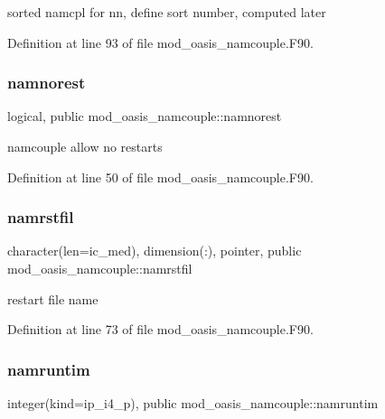 sorted namcpl for nn, define sort number, computed later 



Definition at line 93 of file mod\+\_\+oasis\+\_\+namcouple.\+F90.

\mbox{\label{namespacemod__oasis__namcouple_ad1bd3ea485ad5f5114eb4b7f8c831ccb}} 
\subsubsection{\texorpdfstring{namnorest}{namnorest}}
{\footnotesize\ttfamily logical, public mod\+\_\+oasis\+\_\+namcouple\+::namnorest}



namcouple allow no restarts 



Definition at line 50 of file mod\+\_\+oasis\+\_\+namcouple.\+F90.

\mbox{\label{namespacemod__oasis__namcouple_a54f4b8262f809a20928092782bc78345}} 
\subsubsection{\texorpdfstring{namrstfil}{namrstfil}}
{\footnotesize\ttfamily character(len=ic\+\_\+med), dimension(\+:), pointer, public mod\+\_\+oasis\+\_\+namcouple\+::namrstfil}



restart file name 



Definition at line 73 of file mod\+\_\+oasis\+\_\+namcouple.\+F90.

\mbox{\label{namespacemod__oasis__namcouple_a14505eaa91b2c8ba308c63ff78652206}} 
\subsubsection{\texorpdfstring{namruntim}{namruntim}}
{\footnotesize\ttfamily integer(kind=ip\+\_\+i4\+\_\+p), public mod\+\_\+oasis\+\_\+namcouple\+::namruntim}



